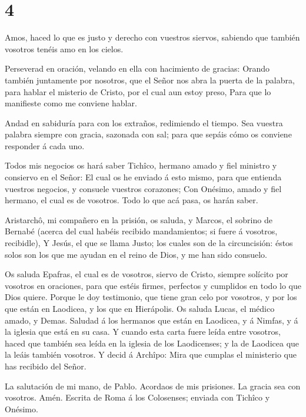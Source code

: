 \hypertarget{section-3}{%
\section{4}\label{section-3}}

 Amos, haced lo que es justo y derecho con vuestros siervos,
sabiendo que también vosotros tenéis amo en los cielos.

 Perseverad en oración, velando en ella con hacimiento de
gracias:  Orando también juntamente por nosotros, que el
Señor nos abra la puerta de la palabra, para hablar el misterio de
Cristo, por el cual aun estoy preso,  Para que lo manifieste
como me conviene hablar.

 Andad en sabiduría para con los extraños, redimiendo el
tiempo.  Sea vuestra palabra siempre con gracia, sazonada
con sal; para que sepáis cómo os conviene responder á cada uno.

 Todos mis negocios os hará saber Tichîco, hermano amado y
fiel ministro y consiervo en el Señor:  El cual os he
enviado á esto mismo, para que entienda vuestros negocios, y consuele
vuestros corazones;  Con Onésimo, amado y fiel hermano, el
cual es de vosotros. Todo lo que acá pasa, os harán saber.

 Aristarchô, mi compañero en la prisión, os saluda, y
Marcos, el sobrino de Bernabé (acerca del cual habéis recibido
mandamientos; si fuere á vosotros, recibidle),  Y Jesús, el
que se llama Justo; los cuales son de la circuncisión: éstos solos son
los que me ayudan en el reino de Dios, y me han sido consuelo.

 Os saluda Epafras, el cual es de vosotros, siervo de
Cristo, siempre solícito por vosotros en oraciones, para que estéis
firmes, perfectos y cumplidos en todo lo que Dios quiere. 
Porque le doy testimonio, que tiene gran celo por vosotros, y por los
que están en Laodicea, y los que en Hierápolis.  Os saluda
Lucas, el médico amado, y Demas.  Saludad á los hermanos
que están en Laodicea, y á Nimfas, y á la iglesia que está en su casa.
 Y cuando esta carta fuere leída entre vosotros, haced que
también sea leída en la iglesia de los Laodicenses; y la de Laodicea que
la leáis también vosotros.  Y decid á Archîpo: Mira que
cumplas el ministerio que has recibido del Señor.

 La salutación de mi mano, de Pablo. Acordaos de mis
prisiones. La gracia sea con vosotros. Amén. Escrita de Roma á los
Colosenses; enviada con Tichîco y Onésimo.

